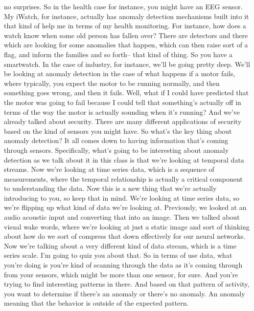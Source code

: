   no surprises.
  So in the health case for instance, you might have an EEG sensor.
  My iWatch, for instance, actually has anomaly detection mechanisms
  built into it that kind of help me in terms of my health monitoring.
  For instance, how does a watch know when some old person has fallen over?
  There are detectors and there which are looking for some anomalies that happen,
  which can then raise sort of a flag, and inform the families and so
  forth-- that kind of thing.
  So you have a smartwatch.
  In the case of industry, for instance, we'll be going pretty deep.
  We'll be looking at anomaly detection in the case
  of what happens if a motor fails, where typically, you
  expect the motor to be running normally, and then something goes wrong,
  and then it fails.
  Well, what if I could have predicted that the motor was
  going to fail because I could tell that something's actually
  off in terms of the way the motor is actually sounding when it's running?
  And we've already talked about security.
  There are many different applications of security based on the kind of sensors
  you might have.
  So what's the key thing about anomaly detection?
  It all comes down to having information that's coming through sensors.
  Specifically, what's going to be interesting about anomaly detection
  as we talk about it in this class is that we're
  looking at temporal data streams.
  Now we're looking at time series data, which
  is a sequence of measurements, where the temporal relationship is actually
  a critical component to understanding the data.
  Now this is a new thing that we're actually introducing to you,
  so keep that in mind.
  We're looking at time series data, so we're flipping up what kind of data
  we're looking at.
  Previously, we looked at an audio acoustic input
  and converting that into an image.
  Then we talked about visual wake words, where
  we're looking at just a static image and sort of thinking
  about how do we sort of compress that down
  effectively for our neural networks.
  Now we're talking about a very different kind of data stream,
  which is a time series scale.
  I'm going to quiz you about that.
  So in terms of use data, what you're doing is
  you're kind of scanning through the data as it's
  coming through from your sensors, which might be more than one sensor,
  for sure.
  And you're trying to find interesting patterns in there.
  And based on that pattern of activity, you
  want to determine if there's an anomaly or there's no anomaly.
  An anomaly meaning that the behavior is outside of the expected pattern.
